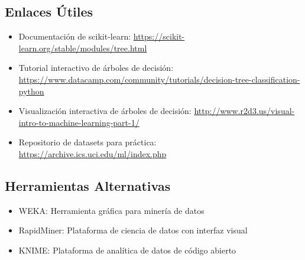 \documentclass[12pt]{article}
\begin{document}
\subsection{Enlaces Útiles}
\begin{itemize}
    \item Documentación de scikit-learn: \url{https://scikit-learn.org/stable/modules/tree.html}
    \item Tutorial interactivo de árboles de decisión: \url{https://www.datacamp.com/community/tutorials/decision-tree-classification-python}
    \item Visualización interactiva de árboles de decisión: \url{http://www.r2d3.us/visual-intro-to-machine-learning-part-1/}
    \item Repositorio de datasets para práctica: \url{https://archive.ics.uci.edu/ml/index.php}
\end{itemize}

\subsection{Herramientas Alternativas}
\begin{itemize}
    \item WEKA: Herramienta gráfica para minería de datos
    \item RapidMiner: Plataforma de ciencia de datos con interfaz visual
    \item KNIME: Plataforma de analítica de datos de código abierto
\end{itemize}
\end{document}
